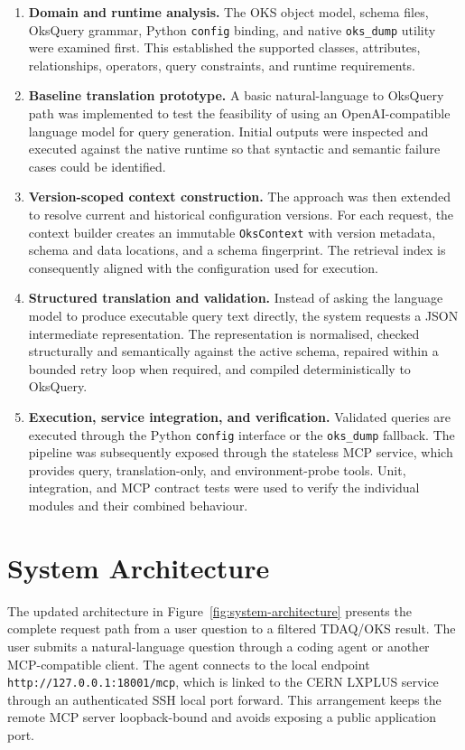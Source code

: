 \documentclass[12pt, a4paper]{report}
\begin{document}
\begin{enumerate}[label=\Roman*., leftmargin=1.1cm]
  \item \textbf{Domain and runtime analysis.} The OKS object model, schema
  files, OksQuery grammar, Python \texttt{config} binding, and native
  \texttt{oks\_dump} utility were examined first. This established the
  supported classes, attributes, relationships, operators, query constraints,
  and runtime requirements.

  \item \textbf{Baseline translation prototype.} A basic natural-language to
  OksQuery path was implemented to test the feasibility of using an
  OpenAI-compatible language model for query generation. Initial outputs were
  inspected and executed against the native runtime so that syntactic and
  semantic failure cases could be identified.

  \item \textbf{Version-scoped context construction.} The approach was then
  extended to resolve current and historical configuration versions. For each
  request, the context builder creates an immutable \texttt{OksContext} with
  version metadata, schema and data locations, and a schema fingerprint. The
  retrieval index is consequently aligned with the configuration used for
  execution.

  \item \textbf{Structured translation and validation.} Instead of asking the
  language model to produce executable query text directly, the system requests
  a JSON intermediate representation. The representation is normalised,
  checked structurally and semantically against the active schema, repaired
  within a bounded retry loop when required, and compiled deterministically to
  OksQuery.

  \item \textbf{Execution, service integration, and verification.} Validated
  queries are executed through the Python \texttt{config} interface or the
  \texttt{oks\_dump} fallback. The pipeline was subsequently exposed through
  the stateless MCP service, which provides query, translation-only, and
  environment-probe tools. Unit, integration, and MCP contract tests were used
  to verify the individual modules and their combined behaviour.
\end{enumerate}

\section{System Architecture}
The updated architecture in Figure~\ref{fig:system-architecture} presents the
complete request path from a user question to a filtered TDAQ/OKS result. The
user submits a natural-language question through a coding agent or another
MCP-compatible client. The agent connects to the local endpoint
\texttt{http://127.0.0.1:18001/mcp}, which is linked to the CERN LXPLUS
service through an authenticated SSH local port forward. This arrangement
keeps the remote MCP server loopback-bound and avoids exposing a public
application port.
\end{document}
